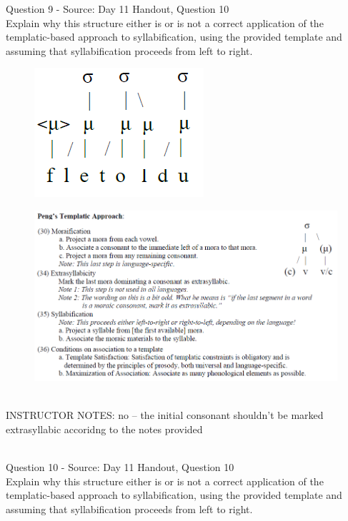 \documentclass[12pt]{article}
\begin{document}
{\large Question 9} - Source: Day 11 Handout, Question 10\\

Explain why this structure either is or is not a correct application of the templatic-based approach to syllabification, using the provided template and assuming that syllabification proceeds from left to right.\\

\begin{figure}[H]
\includegraphics{../images/pengtemplate_fletoldu_no.png}
\end{figure}
\begin{figure}[H]
\includegraphics{../images/peng_template_withdiagram.png}
\end{figure}

~\\
INSTRUCTOR NOTES: no -- the initial consonant shouldn't be marked extrasyllabic accoridng to the notes provided


~\\

{\large Question 10} - Source: Day 11 Handout, Question 10\\

Explain why this structure either is or is not a correct application of the templatic-based approach to syllabification, using the provided template and assuming that syllabification proceeds from left to right.\\
\end{document}
